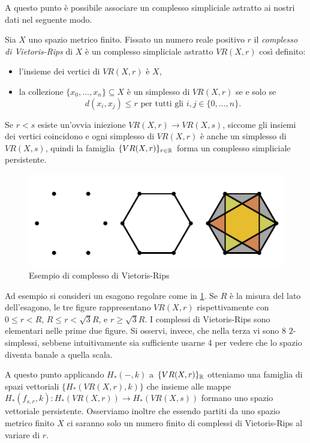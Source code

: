 A questo punto è possibile associare un complesso simpliciale astratto ai nostri dati nel seguente modo.

\begin{definition}
  Sia $X$ uno spazio metrico finito. Fissato un numero reale positivo $r$ il \emph{complesso di Vietoris-Rips} di $X$ è
  un complesso simpliciale astratto $VR(X,r)$ così definito:
  \begin{itemize}
    \item l'insieme dei vertici di $VR(X,r)$ è $X$,
    \item la collezione $\{x_0,\dots,x_n\}\subseteq X$ è un simplesso di $VR(X,r)$ se e solo se
    \begin{equation*}
      d(x_i,x_j) \leq r \mathrm{\text{ per tutti gli }}i,j\in\{0,\dots,n\}.
    \end{equation*}
  \end{itemize}
\end{definition}

\begin{rmk}
  Se $r<s$ esiste un'ovvia iniezione $VR(X,r)\to VR(X,s)$, siccome gli insiemi dei vertici coincidono e ogni simplesso di $VR(X,r)$ è anche un simplesso di $VR(X,s)$, quindi la famiglia $\{VR(X,r)\}_{r\in\mathbb{R}}$ forma un complesso simpliciale persistente.
\end{rmk}

\begin{figure}[h]
  \includegraphics[width=.7\linewidth]{gfx/exhagon.pdf}
  \caption{Esempio di complesso di Vietoris-Rips}
  \label{fig:exhagon}
\end{figure}

Ad esempio si consideri un esagono regolare come in \cref{fig:exhagon}. Se $R$ è la misura del lato dell'esagono, le tre figure rappresentano $VR(X,r)$ rispettivamente con $0\leq r < R$, $R\leq r < \sqrt{3}R$, e $r \geq \sqrt{3}R$. I complessi di Vietoris-Rips sono elementari nelle prime due figure. Si osservi, invece, che nella terza vi sono 8 $2$-simplessi, sebbene intuitivamente sia sufficiente usarne 4 per vedere che lo spazio diventa banale a quella scala.

\begin{sloppypar}
  A questo punto applicando $H_*(-,k)$ a $\{VR(X,r)\}_{\mathbb{R}}$ otteniamo una famiglia di spazi vettoriali $\{H_*(VR(X,r),k)\}$ che insieme alle mappe ${H_*(f_{s,r},k):H_*(VR(X,r))\to H_*(VR(X,s))}$ formano uno spazio vettoriale persistente. Osserviamo inoltre che essendo partiti da uno spazio metrico finito $X$ ci saranno solo un numero finito di complessi di Vietoris-Rips al variare di $r$.
\end{sloppypar}


